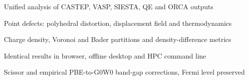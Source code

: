 \item Unified analysis of CASTEP, VASP, SIESTA, QE and ORCA outputs
\item Point defects: polyhedral distortion, displacement field and thermodynamics
\item Charge density, Voronoi and Bader partitions and density-difference metrics
\item Identical results in browser, offline desktop and HPC command line
\item Scissor and empirical PBE-to-G0W0 band-gap corrections, Fermi level preserved
